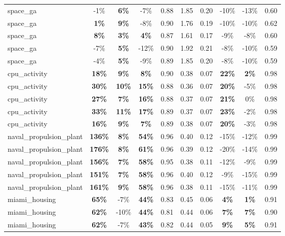 \begin{table}[!htbp]
\begin{small}
\begin{sc}
{\begin{tabular}{lccccccccc}
space\_ga & -1\% & \textbf{6\%} & -7\% & 0.88 & 1.85 & 0.20 & -10\% & -13\% & 0.60 \\
space\_ga & \textbf{1\%} & \textbf{9\%} & -8\% & 0.90 & 1.76 & 0.19 & -10\% & -10\% & 0.62 \\
space\_ga & \textbf{8\%} & \textbf{3\%} & \textbf{4\%} & 0.87 & 1.61 & 0.17 & -9\% & -8\% & 0.60 \\
space\_ga & -7\% & \textbf{5\%} & -12\% & 0.90 & 1.92 & 0.21 & -8\% & -10\% & 0.59 \\
space\_ga & -4\% & \textbf{5\%} & -9\% & 0.89 & 1.85 & 0.20 & -8\% & -10\% & 0.59 \\
cpu\_activity & \textbf{18\%} & \textbf{9\%} & \textbf{8\%} & 0.90 & 0.38 & 0.07 & \textbf{22\%} & \textbf{2\%} & 0.98 \\
cpu\_activity & \textbf{30\%} & \textbf{10\%} & \textbf{15\%} & 0.88 & 0.36 & 0.07 & \textbf{20\%} & -5\% & 0.98 \\
cpu\_activity & \textbf{27\%} & \textbf{7\%} & \textbf{16\%} & 0.88 & 0.37 & 0.07 & \textbf{21\%} & 0\% & 0.98 \\
cpu\_activity & \textbf{33\%} & \textbf{11\%} & \textbf{17\%} & 0.89 & 0.37 & 0.07 & \textbf{23\%} & -2\% & 0.98 \\
cpu\_activity & \textbf{16\%} & \textbf{9\%} & \textbf{7\%} & 0.89 & 0.38 & 0.07 & \textbf{20\%} & -3\% & 0.98 \\
naval\_propulsion\_plant & \textbf{136\%} & \textbf{8\%} & \textbf{54\%} & 0.96 & 0.40 & 0.12 & -15\% & -12\% & 0.99 \\
naval\_propulsion\_plant & \textbf{176\%} & \textbf{8\%} & \textbf{61\%} & 0.96 & 0.39 & 0.12 & -20\% & -14\% & 0.99 \\
naval\_propulsion\_plant & \textbf{156\%} & \textbf{7\%} & \textbf{58\%} & 0.95 & 0.38 & 0.11 & -12\% & -9\% & 0.99 \\
naval\_propulsion\_plant & \textbf{151\%} & \textbf{7\%} & \textbf{58\%} & 0.96 & 0.40 & 0.12 & -9\% & -15\% & 0.99 \\
naval\_propulsion\_plant & \textbf{161\%} & \textbf{9\%} & \textbf{58\%} & 0.96 & 0.38 & 0.11 & -15\% & -11\% & 0.99 \\
miami\_housing & \textbf{65\%} & -7\% & \textbf{44\%} & 0.83 & 0.45 & 0.06 & \textbf{4\%} & \textbf{1\%} & 0.91 \\
miami\_housing & \textbf{62\%} & -10\% & \textbf{44\%} & 0.81 & 0.44 & 0.06 & \textbf{7\%} & \textbf{7\%} & 0.90 \\
miami\_housing & \textbf{62\%} & -7\% & \textbf{43\%} & 0.82 & 0.44 & 0.05 & \textbf{9\%} & \textbf{5\%} & 0.91 \\

\end{tabular}}
\end{sc}
\end{small}
\end{table}

